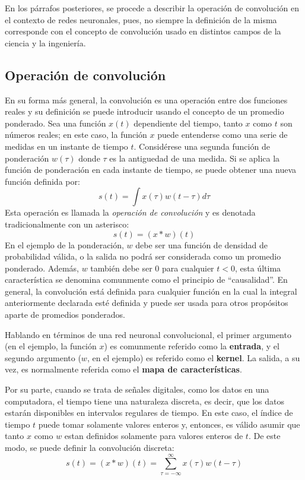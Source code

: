     En los párrafos posteriores, se procede a describir la operación de convolución en el contexto de 
    redes neuronales, pues, no siempre la definición de la misma corresponde con el concepto de convolución
    usado en distintos campos de la ciencia y la ingeniería.

        \subsection{Operación de convolución}
        En su forma más general, la convolución es una operación entre dos funciones reales y su definición se puede introducir
        usando el concepto de un promedio ponderado. Sea una función $x(t)$ dependiente del tiempo, 
        tanto $x$ como $t$ son números reales; en este caso, la función $x$ puede entenderse como una serie de medidas
        en un instante de tiempo $t$. Considérese una segunda función de ponderación $w(\tau)$ donde $\tau$ es la antiguedad 
        de una medida. Si se aplica la función de ponderación en cada instante de tiempo, se puede obtener una nueva función 
        definida por:
        \begin{equation}
            s(t) = \int x(\tau)w(t - \tau) d\tau
        \end{equation} 
        Esta operación es llamada la \textit{operación de convolución} y es denotada tradicionalmente con un asterisco:
        \begin{equation}
            s(t) = (x\ast w)(t)
        \end{equation}
        En el ejemplo de la ponderación, $w$ debe ser una función de densidad de probabilidad válida, o la salida no podrá
        ser considerada como un promedio ponderado. Además, $w$ también debe ser $0$ para cualquier $t<0$, esta última 
        característica se denomina comunmente como el principio de ``causalidad''. En general, la convolución está 
        definida para cualquier función en la cual la integral anteriormente declarada esté definida y puede ser 
        usada para otros propósitos aparte de promedios ponderados.

        Hablando en términos de una red neuronal convolucional, el primer argumento (en el ejemplo, la función $x$) 
        es comunmente referido como la \textbf{entrada}, y el segundo argumento ($w$, en el ejemplo) es referido 
        como el \textbf{kernel}. La salida, a su vez, es normalmente referida como el \textbf{mapa de características}.
        
        Por su parte, cuando se trata de señales digitales, como los datos en una computadora, el tiempo tiene una 
        naturaleza discreta, es decir, que los datos estarán disponibles en intervalos regulares de tiempo. En este 
        caso, el índice de tiempo $t$ puede tomar solamente valores enteros y, entonces, es válido asumir 
        que tanto $x$ como $w$ estan definidos solamente para valores enteros de $t$. De este modo, 
        se puede definir la convolución discreta:
        \begin{equation}
            s(t) = (x \ast w)(t) = \sum_{\tau=-\infty}^{\infty}x(\tau)w(t-\tau)
        \end{equation}

